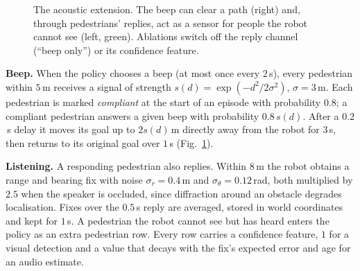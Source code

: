 \documentclass[conference]{IEEEtran}
\begin{document}
\begin{figure}[t]
\centering
{}
\caption{The acoustic extension. The beep can clear a path (right) and, through pedestrians'
replies, act as a sensor for people the robot cannot see (left, green). Ablations switch off
the reply channel (``beep only'') or its confidence feature.}
\label{fig:acoustic}
\end{figure}

\textbf{Beep.} When the policy chooses a beep (at most once every $2$\,s), every pedestrian
within $5$\,m receives a signal of strength $s(d)=\exp(-d^2/2\sigma^2)$, $\sigma=3$\,m. Each
pedestrian is marked \emph{compliant} at the start of an episode with probability $0.8$; a
compliant pedestrian answers a given beep with probability $0.8\,s(d)$. After a $0.2$\,s delay
it moves its goal up to $2s(d)$\,m directly away from the robot for $3$\,s, then returns to its
original goal over $1$\,s (Fig.~\ref{fig:acoustic}).

\textbf{Listening.} A responding pedestrian also replies. Within $8$\,m the robot obtains a
range and bearing fix with noise $\sigma_r=0.4$\,m and $\sigma_\theta=0.12$\,rad, both multiplied
by $2.5$ when the speaker is occluded, since diffraction around an obstacle degrades
localisation. Fixes over the $0.5$\,s reply are averaged, stored in world coordinates and kept
for $1$\,s. A pedestrian the robot cannot see but has heard enters the policy as an extra
pedestrian row. Every row carries a confidence feature, $1$ for a visual detection and a value
that decays with the fix's expected error and age for an audio estimate.
\end{document}
